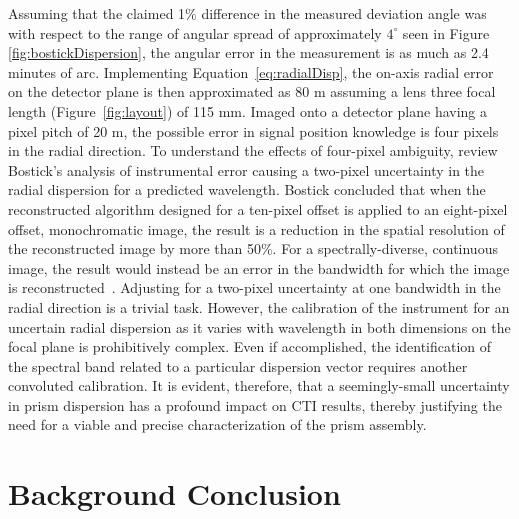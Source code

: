 Assuming that the claimed 1\% difference in the measured deviation angle was with respect to the range of angular spread of approximately $4^\circ$ seen in Figure \ref{fig:bostickDispersion}, the angular error in the measurement is as much as 2.4 minutes of arc. Implementing Equation~\eqref{eq:radialDisp}, the on-axis radial error on the detector plane is then approximated as 80 \textmu m assuming a lens three focal length (Figure~\ref{fig:layout}) of 115 mm. Imaged onto a detector plane having a pixel pitch of 20 \textmu m, the possible error in signal position knowledge is four pixels in the radial direction. To understand the effects of four-pixel ambiguity, review Bostick's analysis of instrumental error causing a two-pixel uncertainty in the radial dispersion for a predicted wavelength. Bostick concluded that when the reconstructed algorithm designed for a ten-pixel offset is applied to an eight-pixel offset, monochromatic image, the result is a reduction in the spatial resolution of the reconstructed image by more than 50\%. For a spectrally-diverse, continuous image, the result would instead be an error in the bandwidth for which the image is reconstructed~\cite{Bostick}. Adjusting for a two-pixel uncertainty at one bandwidth in the radial direction is a trivial task. However, the calibration of the instrument for an uncertain radial dispersion as it varies with wavelength in both dimensions on the focal plane is prohibitively complex. Even if accomplished, the identification of the spectral band related to a particular dispersion vector requires another convoluted calibration. It is evident, therefore, that a seemingly-small uncertainty in prism dispersion has a profound impact on \ac{CTI} results, thereby justifying the need for a viable and precise characterization of the prism assembly.

\section{Background Conclusion}
\label{sec:backgroundConclusion}

